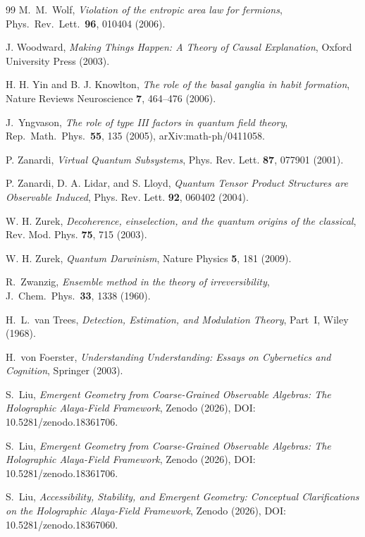 \documentclass[12pt,a4paper,openany]{book}
\begin{document}
\begin{thebibliography}{99}
M.~M.~Wolf,
\emph{Violation of the entropic area law for fermions},
Phys.\ Rev.\ Lett.\ \textbf{96}, 010404 (2006).

J. Woodward, \emph{Making Things Happen: A Theory of Causal Explanation}, Oxford University Press (2003).

H. H. Yin and B. J. Knowlton, \emph{The role of the basal ganglia in habit formation}, Nature Reviews Neuroscience \textbf{7}, 464--476 (2006).

J.~Yngvason,
\emph{The role of type III factors in quantum field theory},
Rep.\ Math.\ Phys.\ \textbf{55}, 135 (2005),
arXiv:math-ph/0411058.

P. Zanardi, \emph{Virtual Quantum Subsystems}, Phys. Rev. Lett. \textbf{87}, 077901 (2001).

P. Zanardi, D. A. Lidar, and S. Lloyd, \emph{Quantum Tensor Product Structures are Observable Induced}, Phys. Rev. Lett. \textbf{92}, 060402 (2004).

W. H. Zurek, \emph{Decoherence, einselection, and the quantum origins of the classical}, Rev. Mod. Phys. \textbf{75}, 715 (2003).

W. H. Zurek, \emph{Quantum Darwinism}, Nature Physics \textbf{5}, 181 (2009).

R.~Zwanzig,
\emph{Ensemble method in the theory of irreversibility},
J.\ Chem.\ Phys.\ \textbf{33}, 1338 (1960).

H.~L.~van Trees,
\emph{Detection, Estimation, and Modulation Theory},
Part~I, Wiley (1968).

H.~von Foerster,
\emph{Understanding Understanding: Essays on Cybernetics
and Cognition},
Springer (2003).

S.~Liu, \emph{Emergent Geometry from Coarse-Grained Observable Algebras: The Holographic Alaya-Field Framework}, Zenodo (2026), DOI: 10.5281/zenodo.18361706.

S.~Liu, \emph{Emergent Geometry from Coarse-Grained Observable Algebras: The Holographic Alaya-Field Framework}, Zenodo (2026), DOI: 10.5281/zenodo.18361706.

S.~Liu, \emph{Accessibility, Stability, and Emergent Geometry: Conceptual Clarifications on the Holographic Alaya-Field Framework}, Zenodo (2026), DOI: 10.5281/zenodo.18367060.


\end{thebibliography}
\end{document}
